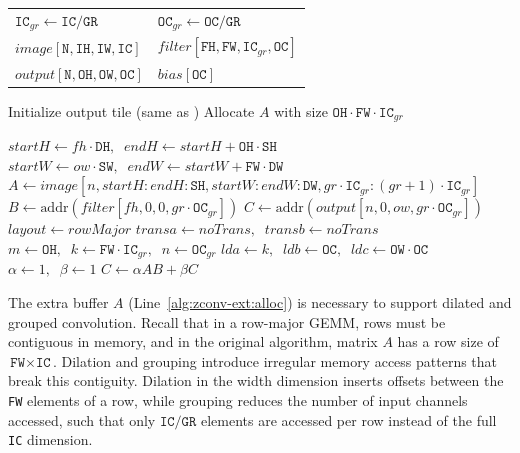 \begin{algorithm}[t]
\caption{Extended \algname algorithm.}
\label{alg:zconv-ext}
\small
\begin{algorithmic}[1]
\Require
\begin{tabular}[t]{@{}ll@{}}
$\texttt{IC}_{gr} \gets \texttt{IC}/\texttt{GR}$ & $\texttt{OC}_{gr} \gets \texttt{OC}/\texttt{GR}$ \\
$image[\texttt{N},\texttt{IH},\texttt{IW},\texttt{IC}]$ & $filter[\texttt{FH},\texttt{FW},\texttt{IC}_{gr},\texttt{OC}]$ \\
$output[\texttt{N},\texttt{OH},\texttt{OW},\texttt{OC}]$ & $bias[\texttt{OC}]$
\end{tabular}

 
   
    \State Initialize output tile (same as )
    \State Allocate $A$ with size $\texttt{OH} \cdot \texttt{FW} \cdot \texttt{IC}_{gr}$ \label{alg:zconv-ext:alloc}

       \label{alg:zconv-ext:gr}
      \State $startH \gets fh \cdot \texttt{DH},\;\; endH \gets startH + \texttt{OH} \cdot \texttt{SH}$
      \State $startW \gets ow \cdot \texttt{SW},\;\; endW \gets startW + \texttt{FW} \cdot \texttt{DW}$
        \State $A \gets image[n,startH : endH : \texttt{SH}, startW : endW : \texttt{DW},gr\cdot \texttt{IC}_{gr} : (gr+1)\cdot \texttt{IC}_{gr}]$
        \State $B \gets \text{addr}(filter[fh,0,0,gr \cdot \texttt{OC}_{gr}])$ \label{alg:zconv-ext:b}
        \State $C \gets \text{addr}(output[n,0,ow,gr \cdot \texttt{OC}_{gr}])$ \label{alg:zconv-ext:c}
        \State $layout \gets rowMajor$
        \State $transa \gets noTrans,\;\; transb \gets noTrans$
        \State $m \gets \texttt{OH},\;\; k \gets \texttt{FW} \cdot \texttt{IC}_{gr},\;\; n \gets \texttt{OC}_{gr}$
        \State $lda \gets k,\;\; ldb \gets \texttt{OC},\;\; ldc \gets \texttt{OW} \cdot \texttt{OC}$
        \State $\alpha \gets 1,\;\; \beta \gets 1$
        \State $C \gets \alpha A B + \beta C$
      \EndFor
    \EndFor
  \EndFor
\EndFor
\end{algorithmic}
\end{algorithm}

The extra buffer $A$ (Line~\ref{alg:zconv-ext:alloc}) is necessary to support dilated and grouped convolution.
Recall that in a row-major GEMM, rows must be contiguous in memory, and in the original algorithm, matrix $A$ has a row size of $\texttt{FW}\times\texttt{IC}$.
Dilation and grouping introduce irregular memory access patterns that break this contiguity.
Dilation in the width dimension inserts offsets between the \texttt{FW} elements of a row, while grouping reduces the number of input channels accessed, such that only $\texttt{IC}/\texttt{GR}$ elements are accessed per row instead of the full \texttt{IC} dimension.

